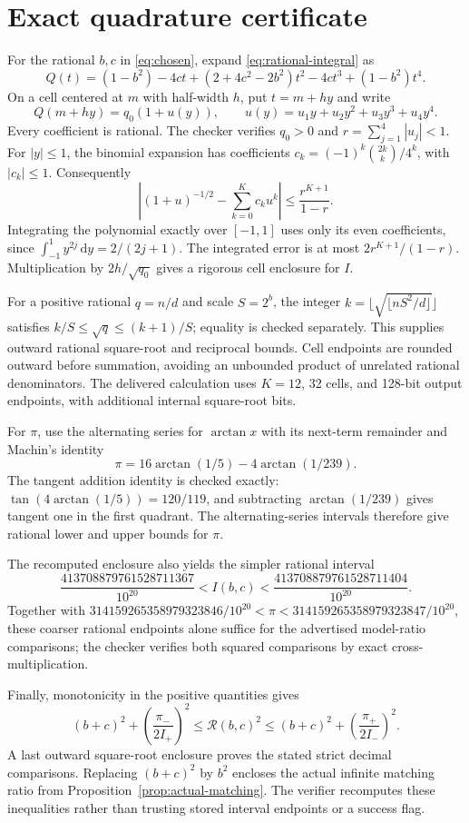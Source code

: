 \documentclass[11pt]{article}
\theoremstyle{remark}
\newcommand{\dd}{\,\mathrm{d}}
\newcommand{\Rformal}{\mathcal R}
\begin{document}
\section{Exact quadrature certificate}
For the rational $b,c$ in \eqref{eq:chosen}, expand \eqref{eq:rational-integral} as
\[
 Q(t)=(1-b^2)-4ct+(2+4c^2-2b^2)t^2-4ct^3+(1-b^2)t^4.
\]
On a cell centered at $m$ with half-width $h$, put $t=m+hy$ and write
\[
 Q(m+hy)=q_0(1+u(y)),\qquad
 u(y)=u_1y+u_2y^2+u_3y^3+u_4y^4.
\]
Every coefficient is rational. The checker verifies $q_0>0$ and
$r=\sum_{j=1}^4|u_j|<1$. For $|y|\le1$, the binomial expansion has coefficients
$c_k=(-1)^k\binom{2k}{k}/4^k$, with $|c_k|\le1$. Consequently
\[
 \left|(1+u)^{-1/2}-\sum_{k=0}^{K}c_ku^k\right|
 \le\frac{r^{K+1}}{1-r}.
\]
Integrating the polynomial exactly over $[-1,1]$ uses only its even coefficients, since $\int_{-1}^1y^{2j}\dd y=2/(2j+1)$. The integrated error is at most $2r^{K+1}/(1-r)$. Multiplication by $2h/\sqrt{q_0}$ gives a rigorous cell enclosure for $I$.

For a positive rational $q=n/d$ and scale $S=2^b$, the integer
$k=\lfloor\sqrt{\lfloor nS^2/d\rfloor}\rfloor$ satisfies
$k/S\le\sqrt q\le(k+1)/S$; equality is checked separately. This supplies outward rational square-root and reciprocal bounds. Cell endpoints are rounded outward before summation, avoiding an unbounded product of unrelated rational denominators. The delivered calculation uses $K=12$, 32 cells, and 128-bit output endpoints, with additional internal square-root bits.

For $\pi$, use the alternating series for $\arctan x$ with its next-term remainder and Machin's identity
\[
 \pi=16\arctan(1/5)-4\arctan(1/239).
\]
The tangent addition identity is checked exactly: $\tan(4\arctan(1/5))=120/119$, and subtracting $\arctan(1/239)$ gives tangent one in the first quadrant. The alternating-series intervals therefore give rational lower and upper bounds for $\pi$.

The recomputed enclosure also yields the simpler rational interval
\[
 \frac{413708879761528711367}{10^{20}}<I(b,c)<\frac{413708879761528711404}{10^{20}}.
\]
Together with $314159265358979323846/10^{20}<\pi<314159265358979323847/10^{20}$, these coarser rational endpoints alone suffice for the advertised model-ratio comparisons; the checker verifies both squared comparisons by exact cross-multiplication.

Finally, monotonicity in the positive quantities gives
\[
 (b+c)^2+\left(\frac{\pi_-}{2I_+}\right)^2
 \le\Rformal(b,c)^2\le
 (b+c)^2+\left(\frac{\pi_+}{2I_-}\right)^2.
\]
A last outward square-root enclosure proves the stated strict decimal comparisons. Replacing $(b+c)^2$ by $b^2$ encloses the actual infinite matching ratio from Proposition~\ref{prop:actual-matching}. The verifier recomputes these inequalities rather than trusting stored interval endpoints or a success flag.
\end{document}
